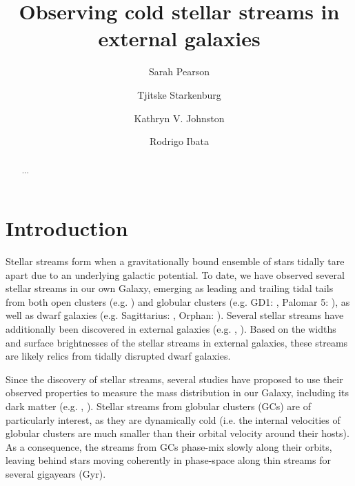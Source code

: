 \documentclass[twocolumn]{aastex62}
\begin{document}
\sloppy\sloppypar\raggedbottom\frenchspacing %
\title{Observing cold stellar streams in external galaxies}


 \author{Sarah Pearson}

\author{Tjitske Starkenburg}

\author{Kathryn V. Johnston}

\author{Rodrigo Ibata}

\begin{abstract}\noindent %
    ...
\end{abstract}

\section{Introduction} \label{sec:intro}
Stellar streams form when a gravitationally bound ensemble of stars tidally tare apart due to an underlying galactic potential. To date, we have observed several stellar streams in our own Galaxy, emerging as leading and trailing tidal tails from both open clusters (e.g. \citealt{roser19}) and globular clusters (e.g. GD1: \citealt{grillmair06}, Palomar 5: \citealt{oden01}), as well as dwarf galaxies (e.g. Sagittarius: \citealt{ibata01}, Orphan: \citealt{belokurov06}). Several stellar streams have additionally been discovered in external galaxies (e.g. \citealt{ibata00}, \citealt{delgado10}). Based on the widths and surface brightnesses of the stellar streams in external galaxies, these streams are likely relics from tidally disrupted dwarf galaxies.

Since the discovery of stellar streams, several studies have proposed to use their observed properties to measure the mass distribution in our Galaxy, including its dark matter (e.g. \citealt{johnston98}, \citealt{johnston01}). Stellar streams from globular clusters (GCs) are of particularly interest, as they are dynamically cold (i.e. the internal velocities of globular clusters are much smaller than their orbital velocity around their hosts). As a consequence,  the streams from GCs phase-mix slowly along their orbits, leaving behind stars moving coherently in phase-space along thin streams for several gigayears (Gyr). %
\end{document}

